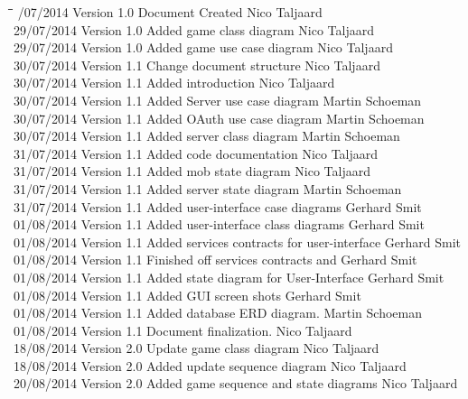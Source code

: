 \documentclass[letterpaper]{article}
\begin{document}
		\begin{tabbing}
			\hspace*{2.5cm}\=\hspace*{2.5cm}\=\hspace*{8cm}\=\hspace*{3cm} /07/2014	\> Version 1.0	\> Document Created 							\> Nico Taljaard \\
			29/07/2014	\> Version 1.0	\> Added game class diagram						\> Nico Taljaard \\
			29/07/2014	\> Version 1.0	\> Added game use case diagram					\> Nico Taljaard \\
			30/07/2014	\> Version 1.1	\> Change document structure					\> Nico Taljaard \\
			30/07/2014	\> Version 1.1	\> Added introduction							\> Nico Taljaard \\
			30/07/2014  \> Version 1.1  \> Added Server use case diagram				\> Martin Schoeman\\
			30/07/2014  \> Version 1.1  \> Added OAuth use case diagram					\> Martin Schoeman\\
			30/07/2014  \> Version 1.1  \> Added server class diagram					\> Martin Schoeman\\
			31/07/2014  \> Version 1.1  \> Added code documentation						\> Nico Taljaard\\
			31/07/2014  \> Version 1.1  \> Added mob state diagram						\> Nico Taljaard\\
			31/07/2014  \> Version 1.1  \> Added server state diagram					\> Martin Schoeman\\
			31/07/2014  \> Version 1.1  \> Added user-interface case diagrams			\> Gerhard Smit\\
			01/08/2014  \> Version 1.1  \> Added user-interface class diagrams			\> Gerhard Smit\\
			01/08/2014  \> Version 1.1  \> Added services contracts for user-interface 	\> Gerhard Smit\\
			01/08/2014  \> Version 1.1  \> Finished off services contracts and 			\> Gerhard Smit\\
			01/08/2014	\> Version 1.1	\> Added state diagram for User-Interface 		\> Gerhard Smit\\
			01/08/2014  \> Version 1.1  \> Added GUI screen shots						\> Gerhard Smit\\
			01/08/2014  \> Version 1.1  \> Added database ERD diagram.					\> Martin Schoeman\\
			01/08/2014  \> Version 1.1  \> Document finalization.						\> Nico Taljaard\\
			18/08/2014  \> Version 2.0  \> Update game class diagram					\> Nico Taljaard\\
			18/08/2014  \> Version 2.0  \> Added update sequence diagram				\> Nico Taljaard\\
			20/08/2014  \> Version 2.0  \> Added game sequence and state diagrams		\> Nico Taljaard\\
		\end{tabbing}
		
\end{document}
